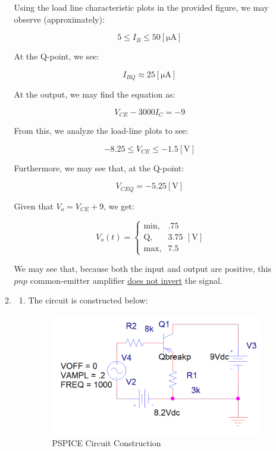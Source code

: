 \begin{enumerate}
\begin{enumerate}
        Using the load line characteristic plots in the provided figure, we may observe (approximately):

        $$\boxed{5\leq I_B\leq 50[\si{\micro\ampere}]}$$

        At the Q-point, we see:

        $$\boxed{I_{BQ}\approx 25[\si{\micro\ampere}]}$$

        At the output, we may find the equation as:

        $$V_{CE}-3000I_C=-9$$

        From this, we analyze the load-line plots to see:

        $$\boxed{-8.25\leq V_{CE}\leq -1.5[\si{\volt}]}$$

        Furthermore, we may see that, at the Q-point:

        $$\boxed{V_{CEQ}=-5.25[\si{\volt}]}$$

        Given that $V_o=V_{CE}+9$, we get:

        $$\boxed{V_o(t)=\left\{\begin{array}{ll} \text{min}, & .75\\\text{Q}, & 3.75\\ \text{max}, & 7.5\end{array}[\si{\volt}]}$$

          We may see that, because both the input and output are positive, this $pnp$ common-emitter amplifier \underline{does not invert} the signal.

      \item 

        \begin{enumerate}

          \item The circuit is constructed below:

            \begin{figure}[H]
              \centering
              \includegraphics[width=.9\textwidth]{Figures/HW6-2a}
              \caption{PSPICE Circuit Construction}
              \label{fig:1}
            \end{figure}


\end{enumerate}
\end{enumerate}
\end{enumerate}
